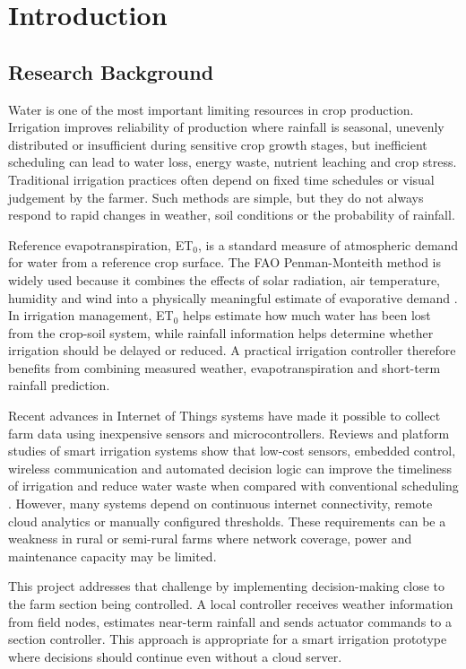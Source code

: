 \documentclass[12pt,a4paper]{report}
\begin{document}
\cleardoublepage
\chapter{Introduction}
\setcounter{page}{1}

\section{Research Background}
Water is one of the most important limiting resources in crop production. Irrigation improves reliability of production where rainfall is seasonal, unevenly distributed or insufficient during sensitive crop growth stages, but inefficient scheduling can lead to water loss, energy waste, nutrient leaching and crop stress. Traditional irrigation practices often depend on fixed time schedules or visual judgement by the farmer. Such methods are simple, but they do not always respond to rapid changes in weather, soil conditions or the probability of rainfall.

Reference evapotranspiration, ET$_0$, is a standard measure of atmospheric demand for water from a reference crop surface. The FAO Penman-Monteith method is widely used because it combines the effects of solar radiation, air temperature, humidity and wind into a physically meaningful estimate of evaporative demand \citep{allen1998crop}. In irrigation management, ET$_0$ helps estimate how much water has been lost from the crop-soil system, while rainfall information helps determine whether irrigation should be delayed or reduced. A practical irrigation controller therefore benefits from combining measured weather, evapotranspiration and short-term rainfall prediction.

Recent advances in Internet of Things systems have made it possible to collect farm data using inexpensive sensors and microcontrollers. Reviews and platform studies of smart irrigation systems show that low-cost sensors, embedded control, wireless communication and automated decision logic can improve the timeliness of irrigation and reduce water waste when compared with conventional scheduling \citep{garcia2020iot,kamienski2019smart}. However, many systems depend on continuous internet connectivity, remote cloud analytics or manually configured thresholds. These requirements can be a weakness in rural or semi-rural farms where network coverage, power and maintenance capacity may be limited.

This project addresses that challenge by implementing decision-making close to the farm section being controlled. A local controller receives weather information from field nodes, estimates near-term rainfall and sends actuator commands to a section controller. This approach is appropriate for a smart irrigation prototype where decisions should continue even without a cloud server.
\end{document}
